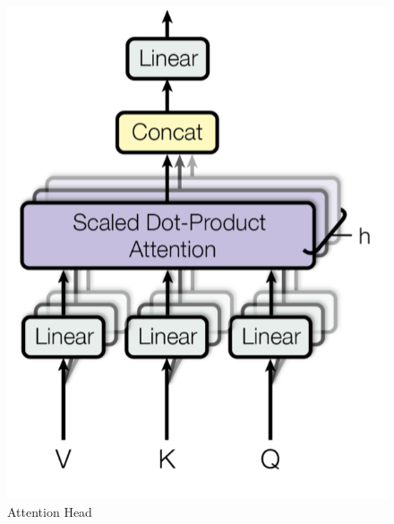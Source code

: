 \documentclass[12pt]{article}
\begin{document}
\begin{figure}[h]
    \centering
    \includegraphics[scale=0.2]{./media/attention_head.png}
    \caption{Attention Head}
    \label{fig:transformer}
\end{figure}
\end{document}
